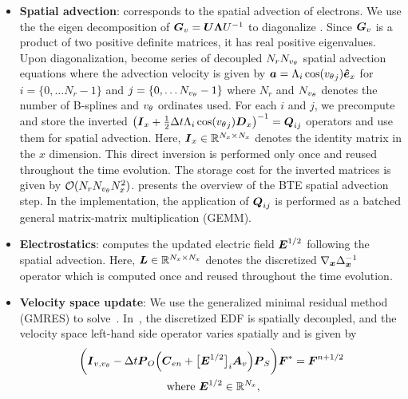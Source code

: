 \begin{itemize}
\item \textbf{Spatial advection}:  corresponds to the spatial advection of electrons. We use the the eigen decomposition of $\boldsymbol{G}_v=\boldsymbol{U}\boldsymbol{\Lambda}U^{-1}$ to diagonalize . Since $\boldsymbol{G}_v$ is a product of two positive definite matrices, it has real positive eigenvalues. Upon diagonalization,  become series of decoupled $N_rN_{v_{\theta}}$ spatial advection equations where the advection velocity is given by $\boldsymbol{a} = \Lambda_i \cos({v_{\theta}}_j) \boldsymbol{\hat{e}}_x$ for $i=\{0,\hdots N_r-1\}$ and $j=\{0,\hdots N_{v_{\theta}}-1\}$ where $N_r$ and $N_{v_{\theta}}$ denotes the number of B-splines and ${v_{\theta}}$ ordinates used. For each $i$ and $j$, we precompute and store the inverted $\left(\boldsymbol{I}_x + \frac{1}{2} \Delta t \Lambda_i \cos({v_{\theta}}_j) \boldsymbol{D}_x \right)^{-1} = \boldsymbol{Q}_{ij}$ operators and use them for spatial advection. Here, $\boldsymbol{I}_x\in \mathbb{R}^{N_x\times N_x}$ denotes the identity matrix in the $x$ dimension. This direct inversion is performed only once and reused throughout the time evolution. The storage cost for the inverted matrices is given by $\mathcal{O}(N_r N_{v_{\theta}} N_x^2)$.  presents the overview of the BTE spatial advection step. In the implementation, the application of $\boldsymbol{Q}_{ij}$ is performed as a batched general matrix-matrix multiplication (GEMM).
%
\item \textbf{Electrostatics}:  computes the updated electric field $\boldsymbol{E}^{1/2}$ following the spatial advection. Here, $\boldsymbol{L}\in \mathbb{R}^{N_x \times N_x}$ denotes the discretized $\nabla_{\boldsymbol{x}} \Delta^{-1}_{\boldsymbol{x}}$ operator which is computed once and reused throughout the time evolution. 
%
\item \textbf{Velocity space update}: We use the generalized minimal residual method (GMRES) to solve~. In~, the discretized EDF is spatially decoupled, and the velocity space left-hand side operator varies spatially and is given by
\begin{multline}
	\biggl(\vect{I}_{v,\vtheta} -\Delta t \vect P_{O}\of{\vect C_{en}  + \bigl[\vect{E}^{1/2}\bigr]_{i} \vect A_v  }  \vect P_{S}\biggr) \vect F^* = \vect F^{n + 1/2}  \\ \text{ where } \vect E^{1/2} \in \reals^{N_x}, 

\end{multline}
\end{itemize}
